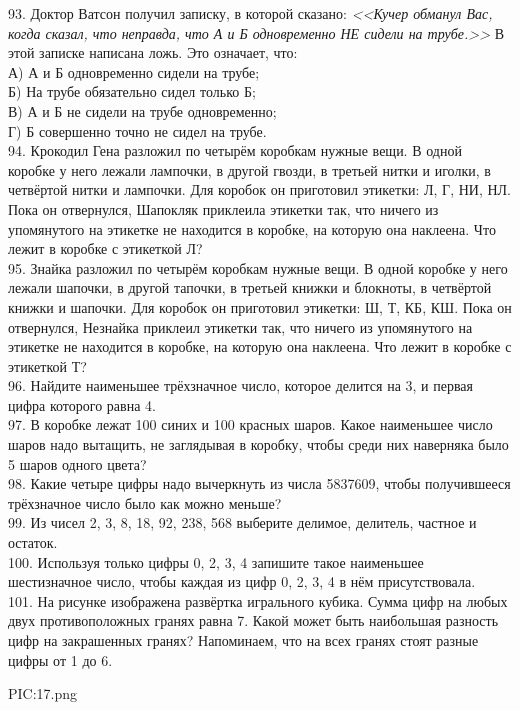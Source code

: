 93. Доктор Ватсон получил записку, в которой сказано: {\it <<Кучер обманул Вас, когда сказал, что неправда, что А и Б одновременно НЕ сидели на трубе.>>} В этой записке написана ложь. Это означает, что:\\
А) А и Б одновременно сидели на трубе;\\
Б) На трубе обязательно сидел только Б;\\
В) А и Б не сидели на трубе одновременно;\\
Г) Б совершенно точно не сидел на трубе.\\
94. Крокодил Гена разложил по четырём коробкам нужные вещи. В одной коробке у него лежали лампочки, в другой гвозди, в третьей нитки и иголки, в четвёртой нитки и лампочки. Для коробок он приготовил этикетки: Л, Г, НИ, НЛ. Пока он отвернулся, Шапокляк приклеила этикетки так, что ничего из упомянутого на этикетке не находится в коробке, на которую она наклеена. Что лежит в коробке с этикеткой Л?\\
95. Знайка разложил по четырём коробкам нужные вещи. В одной коробке у него лежали шапочки, в другой тапочки, в третьей книжки и блокноты, в четвёртой книжки и шапочки. Для коробок он приготовил этикетки: Ш, Т, КБ, КШ. Пока он отвернулся, Незнайка приклеил этикетки так, что ничего из упомянутого на этикетке не находится в коробке, на которую она наклеена. Что лежит в коробке с этикеткой Т?\\
96. Найдите наименьшее трёхзначное число, которое делится на 3, и первая цифра которого равна 4.\\
97. В коробке лежат 100 синих и 100 красных шаров. Какое наименьшее число шаров надо вытащить, не заглядывая в коробку, чтобы среди них наверняка было 5 шаров одного цвета?\\
98. Какие четыре цифры надо вычеркнуть из числа 5837609, чтобы получившееся трёхзначное число было как можно меньше?\\
99. Из чисел 2, 3, 8, 18, 92, 238, 568 выберите делимое, делитель, частное и остаток.\\
100. Используя только цифры 0, 2, 3, 4 запишите такое наименьшее шестизначное число, чтобы каждая из цифр 0, 2, 3, 4 в нём присутствовала.\\
101. На рисунке изображена развёртка игрального кубика. Сумма цифр на любых двух противоположных гранях равна 7. Какой может быть наибольшая разность цифр на закрашенных гранях? Напоминаем, что на всех гранях стоят разные цифры от 1 до 6.
\begin{center}
{{PIC:17.png}}
\end{center}
